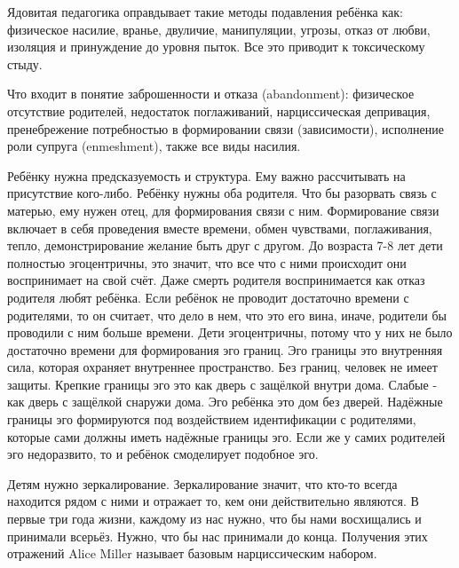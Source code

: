 \documentclass[10pt, fleqn]{article}
\begin{document}
Ядовитая педагогика оправдывает такие методы подавления ребёнка как: физическое насилие, вранье, двуличие, манипуляции, угрозы, отказ от любви, изоляция и принуждение до уровня пыток. Все это приводит к токсическому стыду.

Что входит в понятие заброшенности и отказа (abandonment): физическое отсутствие родителей, недостаток поглаживаний, нарциссическая депривация, пренебрежение потребностью в формировании связи (зависимости), исполнение роли супруга (enmeshment), также все виды насилия.


Ребёнку нужна предсказуемость и структура. Ему важно рассчитывать на присутствие кого-либо.
Ребёнку нужны оба родителя. Что бы разорвать связь с матерью, ему нужен отец, для формирования связи с ним. Формирование связи включает в себя проведения вместе времени, обмен чувствами, поглаживания, тепло, демонстрирование желание быть друг с другом.
До возраста 7-8 лет дети полностью эгоцентричны, это значит, что все что с ними происходит они воспринимает на свой счёт. Даже смерть родителя воспринимается как отказ родителя любят ребёнка.
Если ребёнок не проводит достаточно времени с родителями, то он считает, что дело в нем, что это его вина, иначе, родители бы проводили с ним больше времени.
Дети эгоцентричны, потому что у них не было достаточно времени для формирования эго границ. Эго границы это внутренняя сила, которая охраняет внутреннее пространство. Без границ, человек не имеет защиты. Крепкие границы эго это как дверь с защёлкой внутри дома. Слабые - как дверь с защёлкой снаружи дома. Эго ребёнка это дом без дверей.
Надёжные границы эго формируются под воздействием идентификации с родителями, которые сами должны иметь надёжные границы эго. Если же у самих родителей эго недоразвито, то и ребёнок смоделирует подобное эго.


Детям нужно зеркалирование. Зеркалирование значит, что кто-то всегда находится рядом с ними и отражает то, кем они действительно являются. В первые три года жизни, каждому из нас нужно, что бы нами восхищались и принимали всерьёз. Нужно, что бы нас принимали до конца. Получения этих отражений Alice Miller называет базовым нарциссическим набором.
\end{document}

